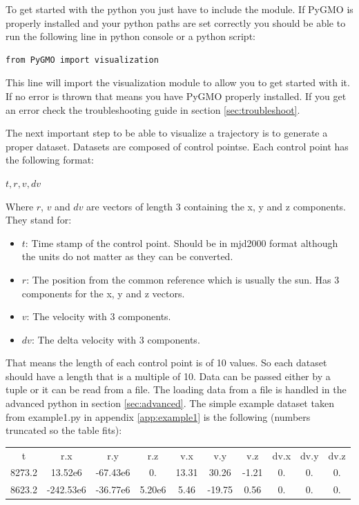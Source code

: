 \documentclass[a4paper,11pt]{article}
\begin{document}
To get started with the python you just have to include the module. If PyGMO is properly installed and your python paths are set correctly you should be able to run the following line in python console or a python script:
\begin{verbatim}
from PyGMO import visualization
\end{verbatim}
This line will import the visualization module to allow you to get started with it. If no error is thrown that means you have PyGMO properly installed. If you get an error check the troubleshooting guide in section \ref{sec:troubleshoot}.

The next important step to be able to visualize a trajectory is to generate a proper dataset. Datasets are composed of control pointse. Each control point has the following format:

$ t, r, v, dv $

Where $r$, $v$ and $dv$ are vectors of length 3 containing the x, y and z components. They stand for:

\begin{itemize}
\item $t$: Time stamp of the control point. Should be in \gls{mjd2000}\cite{mjd2000} format although the units do not matter as they can be converted.
\item $r$: The position from the common reference which is usually the sun. Has 3 components for the x, y and z vectors.
\item $v$: The velocity with 3 components.
\item $dv$: The delta velocity with 3 components.
\end{itemize}

That means the length of each control point is of 10 values. So each dataset should have a length that is a multiple of 10. Data can be passed either by a tuple or it can be read from a file. The loading data from a file is handled in the advanced \gls{python} in section \ref{sec:advanced}. The simple example dataset taken from example1.py in appendix \ref{app:example1} is the following (numbers truncated so the table fits):

\begin{tabular}{|c|c|c|c|c|c|c|c|c|c|}
   t & r.x & r.y & r.z & v.x & v.y & v.z & dv.x & dv.y & dv.z \\
   8273.2 & 13.52e6 & -67.43e6 & 0. & 13.31 & 30.26 & -1.21 & 0. & 0. & 0. \\
   8623.2 & -242.53e6 & -36.77e6 & 5.20e6 & 5.46 & -19.75 & 0.56 & 0. & 0. & 0. \\
\end{tabular}
\end{document}
